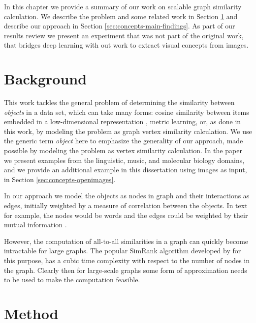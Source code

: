 In this chapter we provide a summary of our work on scalable graph similarity calculation.
We describe the problem and some related work in Section \ref{sec:concepts-background}
and describe our approach in Section \ref{sec:concepts-main-findings}. As part of our
results review we present an experiment that was not part of the original work, that
bridges deep learning with out work to extract visual concepts from images.


\section{Background}

\label{sec:concepts-background}

This work tackles the general problem of determining the similarity between \emph{objects}
in a data set, which can take many forms: cosine similarity between
items embedded in a low-dimensional representation \cite{word2vec}, metric learning\cite{metric-learning-survey}, or, as done
in this work, by modeling the problem as graph vertex similarity calculation.
We use the generic term \emph{object} here to emphasize the generality of our
approach, made possible by modeling the problem as vertex similarity calculation. In the paper we present examples from the linguistic,
music, and molecular biology domains, and we provide an additional example in this dissertation
using images as input, in Section \ref{sec:concepts-openimages}.

In our approach we model the objects as nodes in graph and their interactions as edges,
initially weighted by a measure of correlation between the objects. In text for example, the
nodes would be words and the edges could be weighted by their mutual information \cite{mutual-information-nlp}.

However, the computation of all-to-all similarities in a graph can quickly become
intractable for large graphs. The popular SimRank algorithm developed by
\citet{simrank} for this purpose,
has a cubic time complexity with respect to the number of nodes in the graph.
Clearly then for large-scale graphs some form of approximation needs to be used
to make the computation feasible.


\section{Method}

